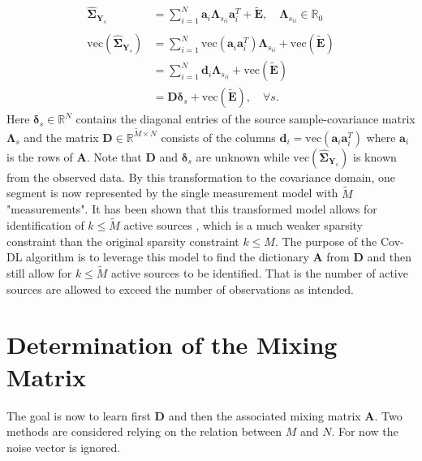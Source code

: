 \begin{align}
\widehat{\boldsymbol{\Sigma}}_{\mathbf{Y}_s} &= \sum_{i=1}^{N} \textbf{a}_i \boldsymbol{\Lambda}_{s_{ii}} \textbf{a}_i^{T} + \widetilde{\textbf{E}}, \quad \boldsymbol{\Lambda}_{s_{ii}} \in \mathbb{R}_0 \nonumber \\
& \nonumber \\
\text{vec}(\widehat{\boldsymbol{\Sigma}}_{\mathbf{Y}_s}) &= \sum_{i=1}^N \text{vec}(\mathbf{a}_i \mathbf{a}_i^T) \boldsymbol{\Lambda}_{s_{ii}} + \text{vec}( \widetilde{\textbf{E}}) \nonumber \\
&= \sum_{i=1}^N \mathbf{d}_i \boldsymbol{\Lambda}_{s_{ii}} + \text{vec}( \widetilde{\textbf{E}}) \nonumber \nonumber \\
&= \mathbf{D} \boldsymbol{\delta}_s + \text{vec}( \widetilde{\textbf{E}}), \quad \forall s. \label{eq:cov1}
\end{align}
Here $\boldsymbol{\delta}_s \in \mathbb{R}^{N}$ contains the diagonal entries of the source sample-covariance matrix $\boldsymbol{\Lambda}_s$
and the matrix $\mathbf{D} \in \mathbb{R}^{\widetilde{M} \times N}$ consists of the columns $\mathbf{d}_i = \text{vec}(\mathbf{a}_i \mathbf{a}_i^T)$ where $\mathbf{a}_i$ is the rows of $\mathbf{A}$. Note that $\mathbf{D}$ and $\boldsymbol{\delta}_s$ are unknown while $\text{vec}(\widehat{\boldsymbol{\Sigma}}_{\mathbf{Y}_s})$ is known from the observed data.
By this transformation to the covariance domain, one segment is now represented by the single measurement model with $\widetilde{M}$ "measurements". 
It has been shown that this transformed model allows for identification of $k \leq \widetilde{M}$ active sources \cite{Pal2015}, which is a much weaker sparsity constraint than the original sparsity constraint $k \leq M$. 
The purpose of the Cov-DL algorithm is to leverage this model to find the dictionary $\mathbf{A}$ from $\mathbf{D}$ and then still allow for $k \leq \widetilde{M}$ active sources to be identified. 
That is the number of active sources are allowed to exceed the number of observations as intended.

\section{Determination of the Mixing Matrix}
The goal is now to learn first $\textbf{D}$ and then the associated mixing matrix $\textbf{A}$. 
Two methods are considered relying on the relation between $M$ and $N$. 
For now the noise vector is ignored.





